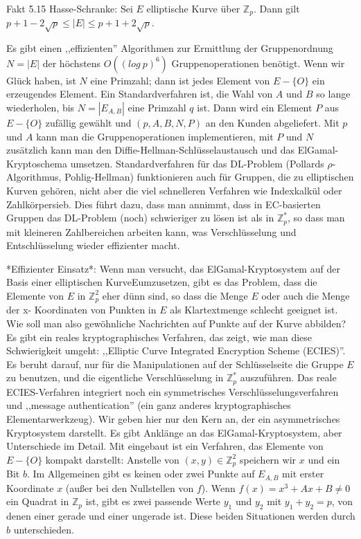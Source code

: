 \documentclass[a4paper]{article}
\begin{document}
\begin{multicols}{3}
    Fakt 5.15 Hasse-Schranke: Sei $E$ elliptische Kurve über $\mathbb{Z}_p$. Dann gilt $p+ 1- 2\sqrt{p}\leq |E|\leq p+1 + 2\sqrt{p}$.

    Es gibt einen ,,effizienten'' Algorithmen zur Ermittlung der Gruppenordnung $N=|E|$ der höchstens $O((log\ p)^6)$ Gruppenoperationen benötigt. Wenn wir Glück haben, ist $N$ eine Primzahl; dann ist jedes Element von $E-\{O\}$ ein erzeugendes Element. Ein Standardverfahren ist, die Wahl von $A$ und $B$ so lange wiederholen, bis $N=|E_{A,B}|$ eine Primzahl $q$ ist. Dann wird ein Element $P$ aus $E-\{O\}$ zufällig gewählt und $(p,A,B,N,P)$ an den Kunden abgeliefert. Mit $p$ und $A$ kann man die Gruppenoperationen implementieren, mit $P$ und $N$ zusätzlich kann man den Diffie-Hellman-Schlüsselaustausch und das ElGamal-Kryptoschema umsetzen.
    Standardverfahren für das DL-Problem (Pollards ${\rho}$-Algorithmus, Pohlig-Hellman) funktionieren auch für Gruppen, die zu elliptischen Kurven gehören, nicht aber die viel schnelleren Verfahren wie Indexkalkül oder Zahlkörpersieb. Dies führt dazu, dass man annimmt, dass in EC-basierten Gruppen das DL-Problem (noch) schwieriger zu lösen ist als in $\mathbb{Z}^*_p$, so dass man mit kleineren Zahlbereichen arbeiten kann, was Verschlüsselung und Entschlüsselung wieder effizienter macht.

    *Effizienter Einsatz*: Wenn man versucht, das ElGamal-Kryptosystem auf der Basis einer elliptischen KurveEumzusetzen, gibt es das Problem, dass die Elemente  von $E$ in $\mathbb{Z}^2_p$ eher dünn sind, so dass die Menge $E$ oder auch die Menge der x-
    Koordinaten von Punkten in $E$ als Klartextmenge schlecht geeignet ist. Wie soll man also gewöhnliche Nachrichten auf Punkte auf der Kurve abbilden? Es gibt ein reales kryptographisches Verfahren, das zeigt, wie man diese Schwierigkeit umgeht: ,,Elliptic Curve Integrated Encryption Scheme (ECIES)''. Es beruht darauf, nur für die Manipulationen auf der Schlüsselseite die Gruppe $E$ zu benutzen, und die eigentliche Verschlüsselung in $\mathbb{Z}^*_p$ auszuführen. Das reale ECIES-Verfahren integriert noch ein symmetrisches Verschlüsselungsverfahren und ,,message authentication'' (ein ganz anderes kryptographisches Elementarwerkzeug). Wir geben hier nur den Kern an, der ein asymmetrisches Kryptosystem darstellt. Es gibt Anklänge an das ElGamal-Kryptosystem, aber Unterschiede im Detail.
    Mit eingebaut ist ein Verfahren, das Elemente von $E-\{O\}$ kompakt darstellt: Anstelle von $(x,y)\in\mathbb{Z}^2_p$ speichern wir $x$ und ein Bit $b$. Im Allgemeinen gibt es keinen oder zwei Punkte auf $E_{A,B}$ mit erster Koordinate $x$ (außer bei den Nullstellen von $f$). Wenn $f(x)=x^3+Ax+B\not= 0$ ein Quadrat in $\mathbb{Z}_p$ ist, gibt es zwei passende Werte $y_1$ und $y_2$ mit $y_1+y_2=p$, von denen einer gerade und einer ungerade ist. Diese beiden Situationen werden durch $b$ unterschieden.


\end{multicols}
\end{document}
